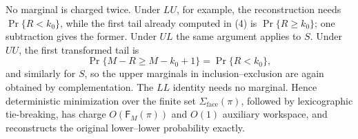 No marginal is charged twice. Under \(LU\), for example, the reconstruction needs \(\Pr\{R<k_0\}\), while the first tail already computed in (4) is \(\Pr\{R\ge k_0\}\); one subtraction gives the former. Under \(UL\) the same argument applies to \(S\). Under \(UU\), the first transformed tail is
\[
\Pr\{M-R\ge M-k_0+1\}=\Pr\{R<k_0\},
\]
and similarly for \(S\), so the upper marginals in inclusion--exclusion are again obtained by complementation. The \(LL\) identity needs no marginal. Hence deterministic minimization over the finite set \(\Sigma_{\mathrm{face}}(\pi)\), followed by lexicographic tie-breaking, has charge \(O(\mathsf F_M(\pi))\) and \(O(1)\) auxiliary workspace, and reconstructs the original lower--lower probability exactly.